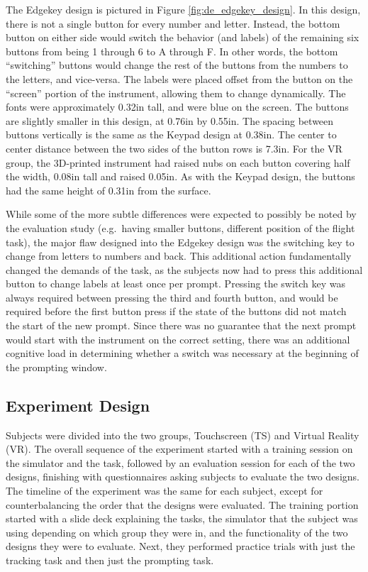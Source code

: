 The Edgekey design is pictured in Figure \ref{fig:de_edgekey_design}.
In this design, there is not a single button for every number and letter.
Instead, the bottom button on either side would switch the behavior (and labels) of the remaining six buttons from being 1 through 6 to A through F.
In other words, the bottom ``switching'' buttons would change the rest of the buttons from the numbers to the letters, and vice-versa.
The labels were placed offset from the button on the ``screen'' portion of the instrument, allowing them to change dynamically.
The fonts were approximately 0.32in tall, and were blue on the screen.
The buttons are slightly smaller in this design, at 0.76in by 0.55in.
The spacing between buttons vertically is the same as the Keypad design at 0.38in.
The center to center distance between the two sides of the button rows is 7.3in.
For the VR group, the 3D-printed instrument had raised nubs on each button covering half the width, 0.08in tall and raised 0.05in.
As with the Keypad design, the buttons had the same height of 0.31in from the surface.

While some of the more subtle differences were expected to possibly be noted by the evaluation study (e.g.\ having smaller buttons, different position of the flight task), the major flaw designed into the Edgekey design was the switching key to change from letters to numbers and back.
This additional action fundamentally changed the demands of the task, as the subjects now had to press this additional button to change labels at least once per prompt.
Pressing the switch key was always required between pressing the third and fourth button, and would be required before the first button press if the state of the buttons did not match the start of the new prompt.
Since there was no guarantee that the next prompt would start with the instrument on the correct setting, there was an additional cognitive load in determining whether a switch was necessary at the beginning of the prompting window.

\subsection{Experiment Design}

Subjects were divided into the two groups, Touchscreen (TS) and Virtual Reality (VR).
The overall sequence of the experiment started with a training session on the simulator and the task, followed by an evaluation session for each of the two designs, finishing with questionnaires asking subjects to evaluate the two designs.
The timeline of the experiment was the same for each subject, except for counterbalancing the order that the designs were evaluated.
The training portion started with a slide deck explaining the tasks, the simulator that the subject was using depending on which group they were in, and the functionality of the two designs they were to evaluate.
Next, they performed practice trials with just the tracking task and then just the prompting task.

